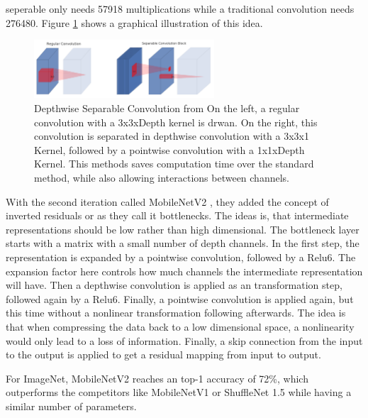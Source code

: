 seperable only needs 57918 multiplications while a traditional convolution needs
276480. Figure \ref{fig:DSConv} shows a graphical illustration of this idea.
\begin{figure}[h!]\label{fig:DSConv}
    \centering
    \includegraphics[width=0.6\textwidth]{images/Depthwise_Separable_Convolution.png}
    \caption{Depthwise Separable Convolution from \cite[Page 3]{sandler2018mobilenetv2} \newline On the left,
     a regular convolution with a 3x3xDepth kernel is drwan. On the right, this
     convolution is separated in depthwise convolution with a 3x3x1 Kernel,
     followed by a pointwise convolution with a 1x1xDepth Kernel. This methods
     saves computation time over the standard method, while also allowing
     interactions between channels.}
\end{figure}


With the second iteration called MobileNetV2 \cite{sandler2018mobilenetv2}, they
added the concept of inverted residuals or as they call it bottlenecks. The
ideas is, that intermediate representations should be low rather than high
dimensional. The bottleneck layer starts with a matrix with a small number of
depth channels. In the first step, the representation is expanded by a pointwise
convolution, followed by a Relu6. The expansion factor here controls how much
channels the intermediate representation will have. Then a depthwise convolution
is applied as an transformation step, followed again by a Relu6. Finally, a
pointwise convolution is applied again, but this time without a nonlinear
transformation following afterwards. The idea is that when compressing the data
back to a low dimensional space, a nonlinearity would only lead to a loss of
information. Finally, a skip connection from the input to the output is applied
to get a residual mapping from input to output.

For ImageNet, MobileNetV2 reaches an top-1 accuracy of 72\%, which outperforms
the competitors like MobileNetV1 or ShuffleNet 1.5 while having a similar number
of parameters.


